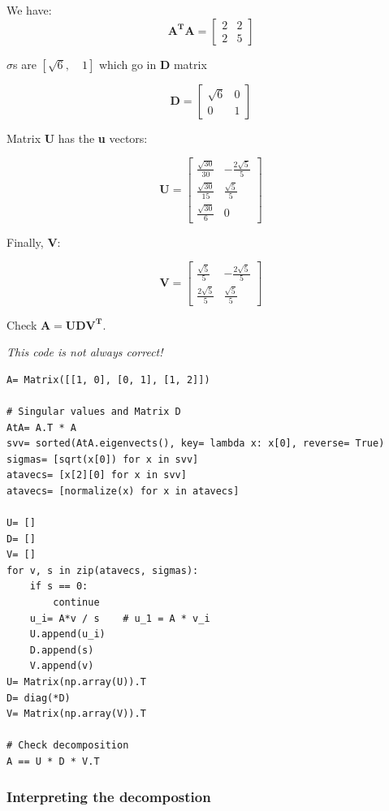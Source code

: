 We have:
$$
\mathbf{A^TA} = \left[\begin{matrix}2 & 2\\2 & 5\end{matrix}\right]
$$

$\sigma$s are $\left [ \sqrt{6}, \quad 1\right ]$ which go in \textbf{D} matrix

$$
\mathbf{D} = \left[\begin{matrix}\sqrt{6} & 0\\0 & 1\end{matrix}\right]
$$

Matrix \textbf{U} has the \textbf{u} vectors:

$$
\mathbf{U} = \left[\begin{matrix}\frac{\sqrt{30}}{30} & - \frac{2 \sqrt{5}}{5}\\\frac{\sqrt{30}}{15} & \frac{\sqrt{5}}{5}\\\frac{\sqrt{30}}{6} & 0\end{matrix}\right]
$$

Finally, \textbf{V}:

$$
\mathbf{V} = \left[\begin{matrix}\frac{\sqrt{5}}{5} & - \frac{2 \sqrt{5}}{5}\\\frac{2 \sqrt{5}}{5} & \frac{\sqrt{5}}{5}\end{matrix}\right]
$$

Check $\mathbf{A = UDV^T}$.

\emph{This code is not always correct!}

\begin{verbatim}
A= Matrix([[1, 0], [0, 1], [1, 2]])

# Singular values and Matrix D
AtA= A.T * A
svv= sorted(AtA.eigenvects(), key= lambda x: x[0], reverse= True)
sigmas= [sqrt(x[0]) for x in svv]
atavecs= [x[2][0] for x in svv]
atavecs= [normalize(x) for x in atavecs]
          
U= []
D= []
V= []
for v, s in zip(atavecs, sigmas):
    if s == 0:
        continue
    u_i= A*v / s    # u_1 = A * v_i
    U.append(u_i)
    D.append(s)
    V.append(v)
U= Matrix(np.array(U)).T
D= diag(*D)
V= Matrix(np.array(V)).T

# Check decomposition
A == U * D * V.T
\end{verbatim}

\subsubsection{Interpreting the decompostion}

